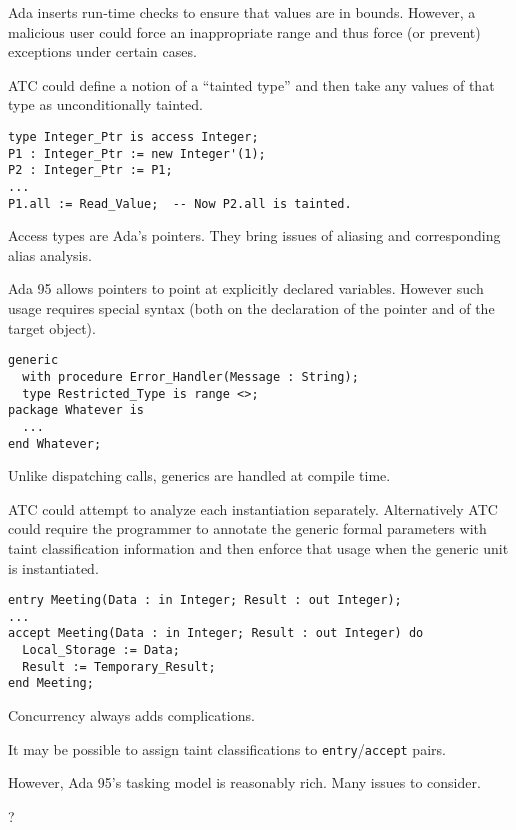 \documentclass[landscape]{slides}
\begin{document}
Ada inserts run-time checks to ensure that values are in bounds. However, a malicious user could
force an inappropriate range and thus force (or prevent) exceptions under certain cases.

ATC could define a notion of a ``tainted type'' and then take any values of that type as
unconditionally tainted.
\stopslide

\begin{verbatim}
type Integer_Ptr is access Integer;
P1 : Integer_Ptr := new Integer'(1);
P2 : Integer_Ptr := P1;
...
P1.all := Read_Value;  -- Now P2.all is tainted.
\end{verbatim}
Access types are Ada's pointers. They bring issues of aliasing and corresponding alias analysis.

Ada 95 allows pointers to point at explicitly declared variables. However such usage requires
special syntax (both on the declaration of the pointer and of the target object).
\stopslide

\begin{verbatim}
generic
  with procedure Error_Handler(Message : String);
  type Restricted_Type is range <>;
package Whatever is
  ...
end Whatever;
\end{verbatim}
Unlike dispatching calls, generics are handled at compile time.

ATC could attempt to analyze each instantiation separately. Alternatively ATC could require the
programmer to annotate the generic formal parameters with taint classification information and
then enforce that usage when the generic unit is instantiated.
\stopslide

\begin{verbatim}
entry Meeting(Data : in Integer; Result : out Integer);
...
accept Meeting(Data : in Integer; Result : out Integer) do
  Local_Storage := Data;
  Result := Temporary_Result;
end Meeting;
\end{verbatim}
Concurrency always adds complications.

It may be possible to assign taint classifications to \texttt{entry}/\texttt{accept} pairs.

However, Ada 95's tasking model is reasonably rich. Many issues to consider.
\stopslide

\stopslide

\begin{center}\Large ?\end{center}
\stopslide
\end{document}
